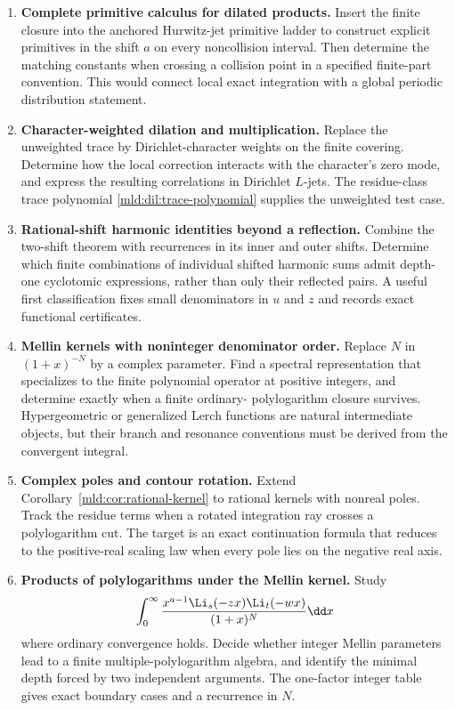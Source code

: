 \begin{enumerate}[label=\textbf{Q\arabic*.},leftmargin=2.7em]
\item \textbf{Complete primitive calculus for dilated products.}
Insert the finite closure into the anchored Hurwitz-jet primitive
ladder to construct explicit primitives in the shift $a$ on every
noncollision interval. Then determine the matching constants when
crossing a collision point in a specified finite-part convention.
This would connect local exact integration with a global periodic
distribution statement.

\item \textbf{Character-weighted dilation and multiplication.}
Replace the unweighted trace by Dirichlet-character weights on the
finite covering. Determine how the local correction interacts with
the character's zero mode, and express the resulting correlations in
Dirichlet $L$-jets. The residue-class trace polynomial
\eqref{mld:dil:trace-polynomial} supplies the unweighted test case.

\item \textbf{Rational-shift harmonic identities beyond a reflection.}
Combine the two-shift theorem with recurrences in its inner and outer
shifts. Determine which finite combinations of individual shifted
harmonic sums admit depth-one cyclotomic expressions, rather than only
their reflected pairs. A useful first classification fixes small
denominators in $u$ and $z$ and records exact functional certificates.

\item \textbf{Mellin kernels with noninteger denominator order.}
Replace $N$ in $(1+x)^{-N}$ by a complex parameter. Find a spectral
representation that specializes to the finite polynomial operator at
positive integers, and determine exactly when a finite ordinary-
polylogarithm closure survives. Hypergeometric or generalized Lerch
functions are natural intermediate objects, but their branch and
resonance conventions must be derived from the convergent integral.

\item \textbf{Complex poles and contour rotation.}
Extend Corollary~\ref{mld:cor:rational-kernel} to rational kernels with
nonreal poles. Track the residue terms when a rotated integration ray
crosses a polylogarithm cut. The target is an exact continuation formula
that reduces to the positive-real scaling law when every pole lies on
the negative real axis.

\item \textbf{Products of polylogarithms under the Mellin kernel.}
Study
\[
 \int_0^\infty \frac{x^{a-1}\Li_s(-zx)\Li_t(-wx)}{(1+x)^N}\dd x
\]
where ordinary convergence holds. Decide whether integer Mellin
parameters lead to a finite multiple-polylogarithm algebra, and identify
the minimal depth forced by two independent arguments. The one-factor
integer table gives exact boundary cases and a recurrence in $N$.


\end{enumerate}
